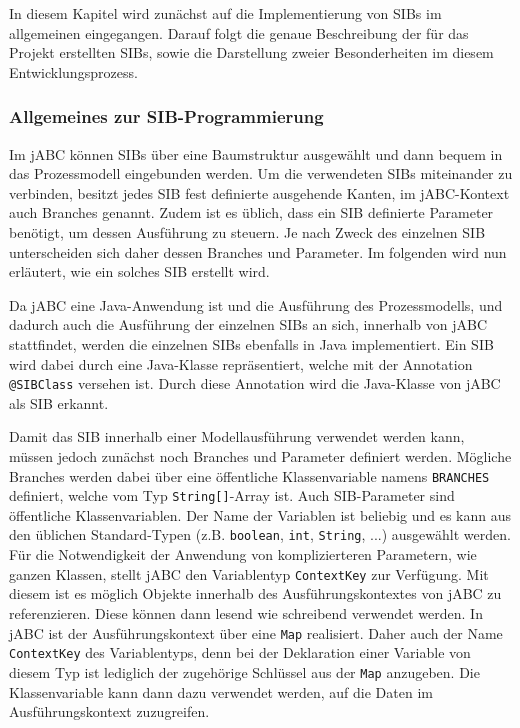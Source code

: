 
In diesem Kapitel wird zunächst auf die Implementierung von SIBs im allgemeinen eingegangen.
Darauf folgt die genaue Beschreibung der für das Projekt erstellten SIBs, sowie die Darstellung zweier
 Besonderheiten im diesem Entwicklungsprozess.
\FloatBarrier
\subsubsection{Allgemeines zur SIB-Programmierung}
Im jABC können SIBs über eine Baumstruktur ausgewählt und dann bequem in das Prozessmodell eingebunden werden.
Um die verwendeten SIBs miteinander zu verbinden, besitzt jedes SIB fest definierte ausgehende Kanten, im
 jABC-Kontext auch Branches genannt. Zudem ist es üblich, dass ein SIB definierte Parameter benötigt, um dessen
 Ausführung zu steuern.
Je nach Zweck des einzelnen SIB unterscheiden sich daher dessen Branches und Parameter.
Im folgenden wird nun erläutert, wie ein solches SIB erstellt wird.

Da jABC eine Java-Anwendung ist und die Ausführung des Prozessmodells, und dadurch auch die Ausführung der
 einzelnen SIBs an sich, innerhalb von jABC stattfindet, werden die einzelnen SIBs ebenfalls in Java implementiert.
Ein SIB wird dabei durch eine Java-Klasse repräsentiert, welche mit der Annotation \lstinline{@SIBClass} versehen ist.
Durch diese Annotation wird die Java-Klasse von jABC als SIB erkannt.

Damit das SIB innerhalb einer Modellausführung verwendet werden kann, müssen jedoch zunächst noch Branches und
 Parameter definiert werden. Mögliche Branches werden dabei über eine öffentliche Klassenvariable namens \lstinline{BRANCHES}
 definiert, welche vom Typ \lstinline{String[]}-Array ist.
Auch SIB-Parameter sind öffentliche Klassenvariablen.
Der Name der Variablen ist beliebig und es kann aus den üblichen Standard-Typen (z.B. \lstinline{boolean}, \lstinline{int},
 \lstinline{String}, ...) ausgewählt werden.
 Für die Notwendigkeit der Anwendung von komplizierteren Parametern, wie ganzen Klassen, stellt jABC den Variablentyp
  \lstinline{ContextKey} zur Verfügung.
 Mit diesem ist es möglich Objekte innerhalb des Ausführungskontextes von jABC zu referenzieren.
 Diese können dann lesend wie schreibend verwendet werden.
 In jABC ist der Ausführungskontext über eine \lstinline{Map} realisiert.
 Daher auch der Name \lstinline{ContextKey} des Variablentyps, denn bei der Deklaration einer Variable von diesem Typ ist
  lediglich der zugehörige Schlüssel aus der \lstinline{Map} anzugeben.
 Die Klassenvariable kann dann dazu verwendet werden, auf die Daten im Ausführungskontext zuzugreifen.

